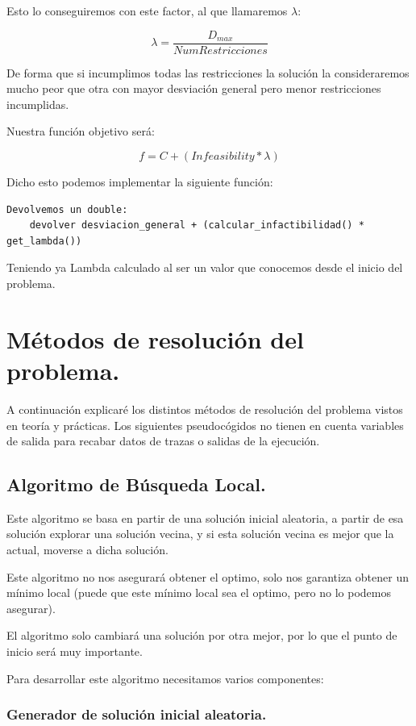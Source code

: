 \documentclass[12pt, spanish]{article}
\begin{document}
Esto lo conseguiremos con este factor, al que llamaremos $\lambda$:

$$ \lambda = \frac{D_{max}}{NumRestricciones} $$ 


De forma que si incumplimos todas las restricciones la solución la consideraremos mucho peor que otra con mayor desviación general pero menor restricciones incumplidas.

Nuestra función objetivo será:

$$ f = C + (\textit{Infeasibility} * \lambda) $$ 

Dicho esto podemos implementar la siguiente función:

\begin{lstlisting}
Devolvemos un double:
	devolver desviacion_general + (calcular_infactibilidad() * get_lambda())
\end{lstlisting}

Teniendo ya Lambda calculado al ser un valor que conocemos desde el inicio del problema.

\newpage

\section{Métodos de resolución del problema.}

A continuación explicaré los distintos métodos de resolución del problema vistos en teoría y prácticas. Los siguientes pseudocógidos no tienen en cuenta variables de salida para recabar datos de trazas o salidas de la ejecución.

\subsection{Algoritmo de Búsqueda Local.}

Este algoritmo se basa en partir de una solución inicial aleatoria, a partir de esa solución explorar una solución vecina, y si esta solución vecina es mejor que la actual, moverse a dicha solución.

Este algoritmo no nos asegurará obtener el optimo, solo nos garantiza obtener un mínimo local (puede que este mínimo local sea el optimo, pero no lo podemos asegurar).

El algoritmo solo cambiará una solución por otra mejor, por lo que el punto de inicio será muy importante.

Para desarrollar este algoritmo necesitamos varios componentes:
 
 \subsubsection{Generador de solución inicial aleatoria.}
 
\end{document}
